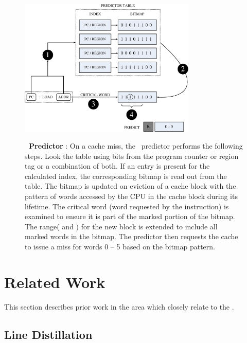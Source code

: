 \begin{figure}[h]
  \centering
  \includegraphics[width=0.75\textwidth]{files/Figures/06-Predictor.pdf}
  \\
  \caption[Amoeba-Cache Predictor]{\textbf{\AC\ Predictor} : On a cache miss, the \AC\ predictor performs the following steps.  Look the table using bits from the program counter or region tag or a combination of both.  If an entry is present for the calculated index, the corresponding bitmap is read out from the table. The bitmap is updated on eviction of a cache block with the pattern of words accessed by the CPU in the cache block during its lifetime.  The critical word (word requested by the instruction) is examined to ensure it is part of the marked portion of the bitmap. The range( and ) for the new block is extended to include all marked words in the bitmap.  The predictor then requests the cache to issue a miss for words 0 -- 5 based on the bitmap pattern.}
  \label{fig:predictor}
\end{figure}

\section{Related Work}

This section describes prior work in the area which closely relate to the \AC{}. 

\subsection{Line Distillation}

